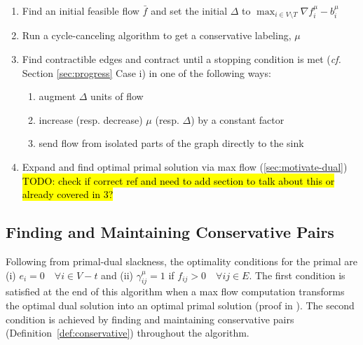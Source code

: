 \documentclass[11pt]{article}
\let\comment\todo
\newcommand{\katie}[1]{\comment[nolist,color=green!40]{k: #1}}
\theoremstyle{definition}
\newtheorem{definition}{Definition}[section]
\theoremstyle{definition}
\theoremstyle{definition}
\newcommand{\fu}{f^{\mu}}
\newcommand{\nfiu}{\nabla \fu_i}
\newcommand{\biu}{b_{i}^{\mu}}
\newcommand{\giij}{\gamma_{ij}^{\mu}}
\renewcommand{\todo}[1]{\hl{TODO: #1}}
\begin{document}
\begin{enumerate}[(1),itemsep=0mm]
\item Find an initial feasible flow $\bar{f}$ and set the initial $\Delta$ to
	  $\max_{i \in V\setminus T} \nfiu - \biu$
\item Run a cycle-canceling algorithm to get a conservative labeling, $\mu$
\item Find contractible edges and contract until a stopping condition is met
	(\emph{cf.} Section \ref{sec:progress} Case i) in one of the following ways:
	\begin{enumerate}
		\item augment $\Delta$ units of flow
		\item increase (resp. decrease) $\mu$ (resp. $\Delta$) by a constant factor
		\item send flow from isolated parts of the graph directly to the sink
	\end{enumerate}
\item Expand and find optimal primal solution via max flow (\ref{sec:motivate-dual}) \todo{check if correct ref and need to add section to talk about this or already covered in 3?}
\end{enumerate}


\subsection{Finding and Maintaining Conservative Pairs}
\label{sec:findconserv2013}
Following from primal-dual slackness, the optimality conditions for the primal are (i) $e_i = 0 \quad \forall i \in V-t$ and (ii) $\giij = 1$ if $f_{ij} > 0 \quad \forall ij \in E$. The first condition is satisfied at the end of this algorithm when a max flow computation transforms the optimal dual solution into an optimal primal solution \katie{explain better} (proof in \cite{article}). The second condition is achieved by finding and maintaining conservative pairs (Definition~\ref{def:conservative}) throughout the algorithm.
\end{document}
